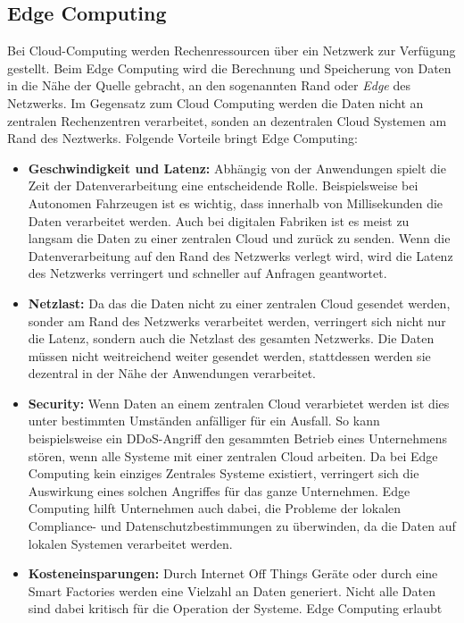 \documentclass[runningheads]{llncs}
\numberwithin{figure}{section}
\begin{document}
\subsection{Edge Computing}
\label{sub:Edge Computing}
Bei Cloud-Computing werden Rechenressourcen über ein Netzwerk zur Verfügung gestellt.
Beim Edge Computing wird die Berechnung und Speicherung von Daten in die Nähe der Quelle gebracht,
an den sogenannten Rand oder \textit{Edge} des Netzwerks. Im Gegensatz zum Cloud Computing werden die Daten
nicht an zentralen Rechenzentren verarbeitet, sonden an dezentralen Cloud Systemen am Rand des Neztwerks. 
Folgende Vorteile bringt Edge Computing: \cite{labrieTopBenefitsEdge}
\begin{itemize}
  \item \textbf{Geschwindigkeit und Latenz:} Abhängig von der Anwendungen spielt die Zeit der Datenverarbeitung eine
  entscheidende Rolle. Beispielsweise bei Autonomen Fahrzeugen ist es wichtig, dass innerhalb von Millisekunden die Daten
  verarbeitet werden. Auch bei digitalen Fabriken ist es meist zu langsam die Daten zu einer zentralen Cloud und zurück
  zu senden. 
  Wenn die Datenverarbeitung auf den Rand des Netzwerks verlegt wird, wird die Latenz des Netzwerks verringert und schneller
  auf Anfragen geantwortet.
  \item \textbf{Netzlast:} Da das die Daten nicht zu einer zentralen Cloud gesendet werden, sonder am Rand des Netzwerks 
  verarbeitet werden, verringert sich nicht nur die Latenz, sondern auch die Netzlast des gesamten Netzwerks. 
  Die Daten müssen nicht weitreichend weiter gesendet werden, stattdessen werden sie 
  dezentral in der Nähe der Anwendungen verarbeitet.
  \item \textbf{Security:} Wenn Daten an einem zentralen Cloud verarbietet werden ist dies unter bestimmten Umständen anfälliger
  für ein Ausfall.
  So kann beispielsweise ein DDoS-Angriff den gesammten Betrieb eines Unternehmens stören, wenn alle Systeme mit einer zentralen
  Cloud arbeiten. Da bei Edge Computing kein einziges Zentrales Systeme existiert, verringert sich die Auswirkung eines solchen
  Angriffes für das ganze Unternehmen.  
  Edge Computing hilft Unternehmen auch dabei, die Probleme der lokalen Compliance- und Datenschutzbestimmungen zu überwinden,
  da die Daten auf lokalen Systemen verarbeitet werden.
  \item \textbf{Kosteneinsparungen:} Durch Internet Off Things Geräte oder durch eine Smart Factories werden
  eine Vielzahl an Daten generiert. Nicht alle Daten sind dabei kritisch für die Operation der Systeme. Edge Computing erlaubt

\end{itemize}
\end{document}
